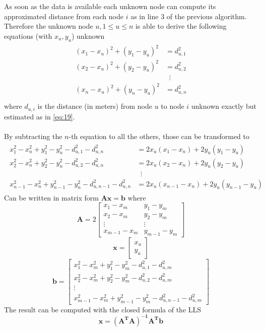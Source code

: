 \documentclass[12pt]{report}
\begin{document}
As soon as the data is available each unknown node can compute its approximated distance from each node $i $ as in line $3$ of the previous algorithm. Therefore the unknown node $u, 1\leq u\leq n$ is able to derive the following equations (with $x_u,y_u$) unknown
\begin{align}
\begin{split} 
(x_1-x_u)^2+(y_1-y_u)^2&=d_{u,1}^2 \\ 
(x_2-x_u)^2+(y_2-y_u)^2&=d_{u,2}^2 \\ 
&\;\;\vdots\\
(x_n-x_u)^2+(y_n-y_u)^2&=d_{u,n}^2 \\
\end{split}
\end{align} 
where $d_{u,i}$ is the distance (in meters) from node $u$ to node $i$ unknown exactly but estimated as in \eqref{eq:19}.
\\\\By subtracting the $n$-th equation to all the others, those can be transformed to
\begin{align}
\begin{split} 
x_1^2-x_n^2+y_1^2-y_n^2-d_{u,1}^2-d_{u,n}^2&=2x_u(x_1-x_n)+2y_u(y_1-y_u)\\ 
x_2^2-x_n^2+y_2^2-y_n^2-d_{u,2}^2-d_{u,n}^2&=2x_u(x_2-x_n)+2y_u(y_2-y_u)\\
&\;\;\vdots\\
x_{n-1}^2-x_n^2+y_{n-1}^2-y_n^2-d_{u,n-1}^2-d_{u,n}^2&=2x_u(x_{n-1}-x_n)+2y_u(y_{n-1}-y_u)
\end{split}
\end{align}
Can be written in matrix form $\mathbf{Ax}=\mathbf{b}$
where 
\begin{equation}
    \mathbf{A}=2\begin{bmatrix}
    x_1-x_m & y_1-y_m\\
    x_2-x_m & y_2-y_m\\
    \vdots & \vdots\\
    x_{m-1}-x_m & y_{m-1}-y_m
    \end{bmatrix}
\end{equation}
\begin{equation}
    \mathbf{x}=\begin{bmatrix}
    x_u\\
    y_u
    \end{bmatrix}
\end{equation}
\begin{equation}
    \mathbf{b}=\begin{bmatrix}
        x_{1}^2-x_m^2+y_{1}^2-y_m^2-d_{u,1}^2-d^2_{u,m}\\
        x_{2}^2-x_m^2+y_{2}^2-y_m^2-d_{u,2}^2-d^2_{u,m}\\
        \vdots\\
        x_{m-1}^2-x_m^2+y_{m-1}^2-y_m^2-d_{u,n-1}^2-d^2_{u,m}
    \end{bmatrix}
\end{equation}
The result can be computed with the closed formula of the LLS
\begin{equation}
    \mathbf{x}=\mathbf{(A^TA)^{-1}A^Tb}
\end{equation}
\clearpage
\end{document}
